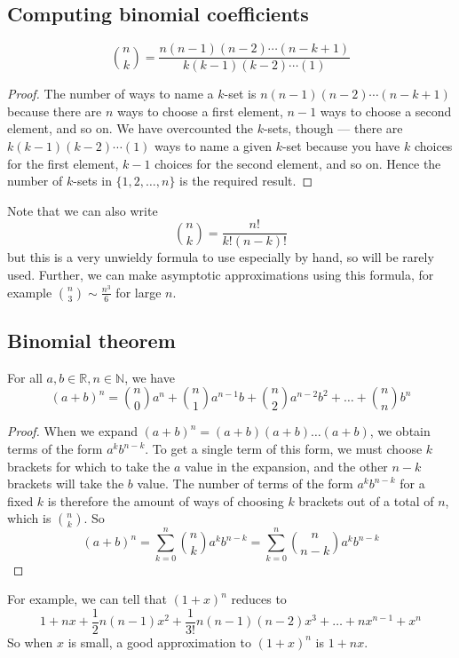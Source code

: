 \subsection{Computing binomial coefficients}
\begin{proposition}
	\[
		\binom{n}{k} = \frac{n(n-1)(n-2)\cdots(n-k+1)}{k(k-1)(k-2)\cdots(1)}
	\]
\end{proposition}
\begin{proof}
	The number of ways to name a \(k\)-set is \(n(n-1)(n-2)\cdots(n-k+1)\) because there are \(n\) ways to choose a first element, \(n-1\) ways to choose a second element, and so on.
	We have overcounted the \(k\)-sets, though --- there are \(k(k-1)(k-2)\cdots(1)\) ways to name a given \(k\)-set because you have \(k\) choices for the first element, \(k-1\) choices for the second element, and so on.
	Hence the number of \(k\)-sets in \(\{ 1, 2, \dots, n \}\) is the required result.
\end{proof}
Note that we can also write
\[
	\binom{n}{k} = \frac{n!}{k!(n-k)!}
\]
but this is a very unwieldy formula to use especially by hand, so will be rarely used.
Further, we can make asymptotic approximations using this formula, for example \(\binom{n}{3} \sim \frac{n^3}{6}\) for large \(n\).

\subsection{Binomial theorem}
\begin{theorem}
	For all \(a, b \in \mathbb R, n \in \mathbb N\), we have
	\[
		(a+b)^n = \binom{n}{0}a^n + \binom{n}{1}a^{n-1}b + \binom{n}{2}a^{n-2}b^2 + \dots + \binom{n}{n}b^n
	\]
\end{theorem}
\begin{proof}
	When we expand \((a+b)^n = (a+b)(a+b)\dots(a+b)\), we obtain terms of the form \(a^k b^{n-k}\).
	To get a single term of this form, we must choose \(k\) brackets for which to take the \(a\) value in the expansion, and the other \(n-k\) brackets will take the \(b\) value.
	The number of terms of the form \(a^k b^{n-k}\) for a fixed \(k\) is therefore the amount of ways of choosing \(k\) brackets out of a total of \(n\), which is \(\binom{n}{k}\).
	So
	\[
		(a+b)^n = \sum_{k=0}^n \binom{n}{k}a^k b^{n-k} = \sum_{k=0}^n \binom{n}{n-k}a^k b^{n-k}
	\]
\end{proof}
For example, we can tell that \((1+x)^n\) reduces to
\[
	1 + nx + \frac{1}{2}n(n-1)x^2 + \frac{1}{3!}n(n-1)(n-2)x^3 + \dots + nx^{n-1} + x^n
\]
So when \(x\) is small, a good approximation to \((1+x)^n\) is \(1 + nx\).

